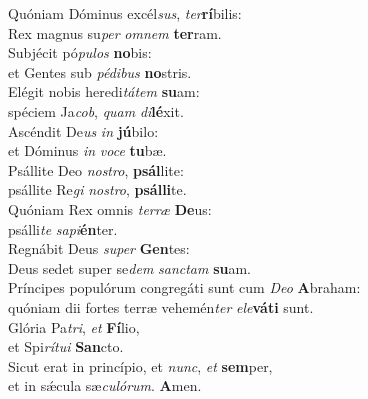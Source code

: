 \evenverse Quóniam Dóminus excél\textit{sus}, \textit{ter}\textbf{rí}bilis:~\*\\
\evenverse Rex magnus su\textit{per} \textit{om}\textit{nem} \textbf{ter}ram.\\
\oddverse Subjécit pó\textit{pu}\textit{los} \textbf{no}bis:~\*\\
\oddverse et Gentes sub \textit{pé}\textit{di}\textit{bus} \textbf{no}stris.\\
\evenverse Elégit nobis heredi\textit{tá}\textit{tem} \textbf{su}am:~\*\\
\evenverse spéciem Ja\textit{cob}, \textit{quam} \textit{di}\textbf{lé}xit.\\
\oddverse Ascéndit De\textit{us} \textit{in} \textbf{jú}bilo:~\*\\
\oddverse et Dóminus \textit{in} \textit{vo}\textit{ce} \textbf{tu}bæ.\\
\evenverse Psállite Deo \textit{no}\textit{stro}, \textbf{psál}lite:~\*\\
\evenverse psállite Re\textit{gi} \textit{no}\textit{stro}, \textbf{psál}\textbf{li}te.\\
\oddverse Quóniam Rex omnis \textit{ter}\textit{ræ} \textbf{De}us:~\*\\
\oddverse psálli\textit{te} \textit{sa}\textit{pi}\textbf{én}ter.\\
\evenverse Regnábit Deus \textit{su}\textit{per} \textbf{Gen}tes:~\*\\
\evenverse Deus sedet super se\textit{dem} \textit{san}\textit{ctam} \textbf{su}am.\\
\oddverse Príncipes populórum congregáti sunt cum \textit{De}\textit{o} \textbf{A}braham:~\*\\
\oddverse quóniam dii fortes terræ vehemén\textit{ter} \textit{e}\textit{le}\textbf{vá}\textbf{ti} sunt.\\
\evenverse Glória Pa\textit{tri}, \textit{et} \textbf{Fí}lio,~\*\\
\evenverse et Spi\textit{rí}\textit{tu}\textit{i} \textbf{San}cto.\\
\oddverse Sicut erat in princípio, et \textit{nunc}, \textit{et} \textbf{sem}per,~\*\\
\oddverse et in sǽcula sæ\textit{cu}\textit{ló}\textit{rum}. \textbf{A}men.\\
